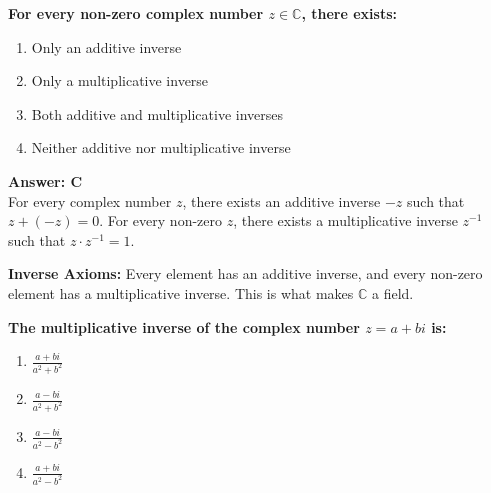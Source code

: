 \documentclass[12pt,a4paper]{article}
\begin{document}
\newpage
\begin{questiontitle}[MCQ 59]
\textbf{For every non-zero complex number \( z \in \mathbb{C} \), there exists:}
\end{questiontitle}

\begin{partbox}[Options]
\begin{enumerate}[label=\Alph*.]
    \item Only an additive inverse
    \item Only a multiplicative inverse
    \item Both additive and multiplicative inverses
    \item Neither additive nor multiplicative inverse
\end{enumerate}
\end{partbox}

\begin{answerstyle}
\textbf{Answer: C} \\
For every complex number \( z \), there exists an additive inverse \( -z \) such that \( z + (-z) = 0 \). For every non-zero \( z \), there exists a multiplicative inverse \( z^{-1} \) such that \( z \cdot z^{-1} = 1 \).
\end{answerstyle}

\begin{conceptbox}
\textbf{Inverse Axioms:} Every element has an additive inverse, and every non-zero element has a multiplicative inverse. This is what makes \( \mathbb{C} \) a field.
\end{conceptbox}

\newpage
\begin{questiontitle}[MCQ 60]
\textbf{The multiplicative inverse of the complex number \( z = a + bi \) is:}
\end{questiontitle}

\begin{partbox}[Options]
\begin{enumerate}[label=\Alph*.]
    \item \( \frac{a + bi}{a^2 + b^2} \)
    \item \( \frac{a - bi}{a^2 + b^2} \)
    \item \( \frac{a - bi}{a^2 - b^2} \)
    \item \( \frac{a + bi}{a^2 - b^2} \)
\end{enumerate}
\end{partbox}
\end{document}
